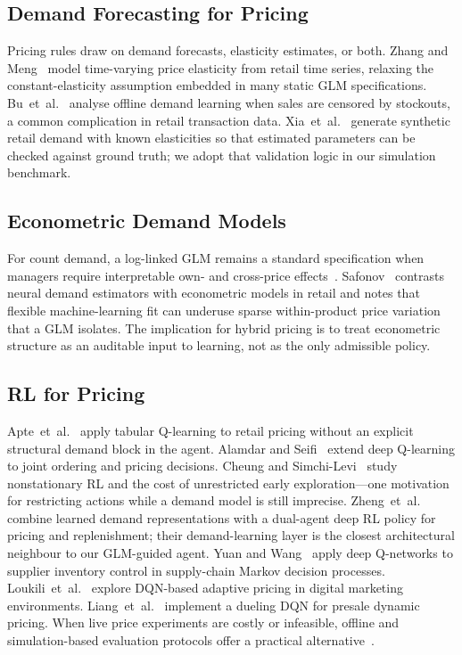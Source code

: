 \documentclass[journal, 10pt, twoside]{IEEEtran}
\begin{document}
\subsection{Demand Forecasting for Pricing}

Pricing rules draw on demand forecasts, elasticity estimates, or both.
Zhang and Meng~\cite{zhang2025} model time-varying price elasticity
from retail time series, relaxing the constant-elasticity assumption
embedded in many static GLM specifications.
Bu~et~al.~\cite{bu2023} analyse offline demand learning when sales are
censored by stockouts, a common complication in retail transaction
data.
Xia~et~al.~\cite{xia2023} generate synthetic retail demand with known
elasticities so that estimated parameters can be checked against
ground truth; we adopt that validation logic in our simulation
benchmark.

\subsection{Econometric Demand Models}

For count demand, a log-linked GLM remains a standard specification
when managers require interpretable own- and cross-price
effects~\cite{zhang2025}.
Safonov~\cite{safonov2024} contrasts neural demand estimators with
econometric models in retail and notes that flexible machine-learning
fit can underuse sparse within-product price variation that a GLM
isolates.
The implication for hybrid pricing is to treat econometric structure
as an auditable input to learning, not as the only admissible policy.

\subsection{RL for Pricing}

Apte~et~al.~\cite{apte2024} apply tabular Q-learning to retail pricing
without an explicit structural demand block in the agent.
Alamdar and Seifi~\cite{alamdar2024} extend deep Q-learning to joint
ordering and pricing decisions.
Cheung and Simchi-Levi~\cite{cheung2023} study nonstationary RL and
the cost of unrestricted early exploration---one motivation for
restricting actions while a demand model is still imprecise.
Zheng~et~al.~\cite{zheng2024} combine learned demand representations
with a dual-agent deep RL policy for pricing and replenishment; their
demand-learning layer is the closest architectural neighbour to our
GLM-guided agent.
Yuan and Wang~\cite{yuan2024} apply deep Q-networks to supplier
inventory control in supply-chain Markov decision processes.
Loukili~et~al.~\cite{loukili2025} explore DQN-based adaptive pricing in
digital marketing environments.
Liang~et~al.~\cite{liang2023} implement a dueling DQN for presale
dynamic pricing.
When live price experiments are costly or infeasible, offline and
simulation-based evaluation protocols offer a practical
alternative~\cite{nambiar2022}.
\end{document}
